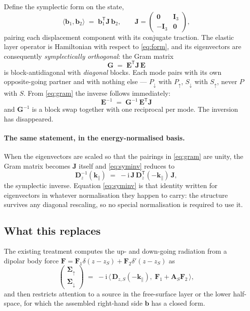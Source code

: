 \documentclass[11pt,a4paper]{article}
\newcommand{\ii}{\mathrm{i}}
\newcommand{\bI}{\mathbf{I}}
\newcommand{\bJ}{\mathbf{J}}
\newcommand{\bD}{\mathbf{D}}
\newcommand{\bE}{\mathbf{E}}
\newcommand{\bb}{\mathbf{b}}
\newcommand{\bS}{\boldsymbol{\Sigma}}
\newcommand{\kpar}{\mathbf{k}_{\parallel}}
\begin{document}
Define the symplectic form on the state,
\begin{equation}\label{eq:form}
  \langle \bb_1,\bb_2\rangle \;=\; \bb_1^{\mathsf T}\bJ\,\bb_2 ,
  \qquad
  \bJ=\begin{pmatrix}\mathbf{0}&\bI_3\\-\bI_3&\mathbf{0}\end{pmatrix},
\end{equation}
pairing each displacement component with its conjugate traction. The elastic
layer operator is Hamiltonian with respect to \eqref{eq:form}, and its
eigenvectors are consequently \emph{symplectically orthogonal}: the Gram matrix
\begin{equation}\label{eq:gram}
  \mathbf{G} \;=\; \bE^{\mathsf T}\bJ\,\bE
\end{equation}
is block-antidiagonal with \emph{diagonal} blocks. Each mode pairs with its own
opposite-going partner and with nothing else --- $P_{\downarrow}$ with
$P_{\uparrow}$, $S_{\downarrow}$ with $S_{\uparrow}$, never $P$ with $S$. From
\eqref{eq:gram} the inverse follows immediately:
\begin{equation}\label{eq:syminv}
  \boxed{\;\bE^{-1} \;=\; \mathbf{G}^{-1}\,\bE^{\mathsf T}\bJ\;}
\end{equation}
and $\mathbf{G}^{-1}$ is a block swap together with one reciprocal per mode. The
inversion has disappeared.

\paragraph{The same statement, in the energy-normalised basis.} When the
eigenvectors are scaled so that the pairings in \eqref{eq:gram} are unity, the
Gram matrix becomes $\bJ$ itself and \eqref{eq:syminv} reduces to
\begin{equation}\label{eq:d1def}
  \bD_z^{-1}(\kpar) \;=\; -\ii\,\bJ\,\bD_z^{\mathsf T}(-\kpar)\,\bJ ,
\end{equation}
the symplectic inverse. Equation \eqref{eq:syminv} is that identity written for
eigenvectors in whatever normalisation they happen to carry: the structure
survives any diagonal rescaling, so no special normalisation is required to use
it.

\subsection{What this replaces}

The existing treatment computes the up- and down-going radiation from a dipolar
body force $\mathbf{F}=\mathbf{F}_1\delta(z-z_S)+\mathbf{F}_2\delta'(z-z_S)$ as
\begin{equation}\label{eq:boxsource}
  \begin{pmatrix}\bS_{\uparrow}\\ \bS_{\downarrow}\end{pmatrix}
  \;=\;-\ii\,\bigl\langle\,\bD_{z,S}(-\kpar),\;
  \mathbf{F}_1+\mathbf{A}_S\mathbf{F}_2\,\bigr\rangle ,
\end{equation}
and then restricts attention to a source in the free-surface layer or the lower
half-space, for which the assembled right-hand side $\bb$ has a closed form.
\end{document}
